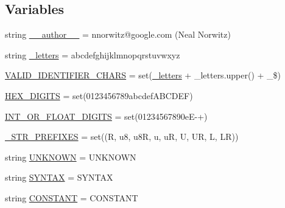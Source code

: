 \subsection*{Variables}
\begin{DoxyCompactItemize}
\item 
string \mbox{\hyperlink{namespacecpp_1_1tokenize_a13ec118ce7f7df6ecd18b3c74d37708a}{\+\_\+\+\_\+author\+\_\+\+\_\+}} = \textquotesingle{}nnorwitz@google.\+com (Neal Norwitz)\textquotesingle{}
\item 
string \mbox{\hyperlink{namespacecpp_1_1tokenize_ab5a9d36b61d51e76473c383db9e4b934}{\+\_\+letters}} = \textquotesingle{}abcdefghijklmnopqrstuvwxyz\textquotesingle{}
\item 
\mbox{\hyperlink{namespacecpp_1_1tokenize_a733f1cf605b1630fb6a0a7f30aaefbec}{V\+A\+L\+I\+D\+\_\+\+I\+D\+E\+N\+T\+I\+F\+I\+E\+R\+\_\+\+C\+H\+A\+RS}} = set(\mbox{\hyperlink{namespacecpp_1_1tokenize_ab5a9d36b61d51e76473c383db9e4b934}{\+\_\+letters}} + \+\_\+letters.\+upper() + \textquotesingle{}\+\_\$\textquotesingle{})
\item 
\mbox{\hyperlink{namespacecpp_1_1tokenize_a8b45b0f0f2b504757e9ede9c342b2c36}{H\+E\+X\+\_\+\+D\+I\+G\+I\+TS}} = set(\textquotesingle{}0123456789abcdef\+A\+B\+C\+D\+E\+F\textquotesingle{})
\item 
\mbox{\hyperlink{namespacecpp_1_1tokenize_ad8c6dd06d4e6ef2e24e9186acb0aff43}{I\+N\+T\+\_\+\+O\+R\+\_\+\+F\+L\+O\+A\+T\+\_\+\+D\+I\+G\+I\+TS}} = set(\textquotesingle{}01234567890e\+E-\/+\textquotesingle{})
\item 
\mbox{\hyperlink{namespacecpp_1_1tokenize_aef952930004258aec982a51c8875e82a}{\+\_\+\+S\+T\+R\+\_\+\+P\+R\+E\+F\+I\+X\+ES}} = set((\textquotesingle{}R\textquotesingle{}, \textquotesingle{}u8\textquotesingle{}, \textquotesingle{}u8R\textquotesingle{}, \textquotesingle{}u\textquotesingle{}, \textquotesingle{}uR\textquotesingle{}, \textquotesingle{}U\textquotesingle{}, \textquotesingle{}UR\textquotesingle{}, \textquotesingle{}L\textquotesingle{}, \textquotesingle{}LR\textquotesingle{}))
\item 
string \mbox{\hyperlink{namespacecpp_1_1tokenize_a0dfd65c08216eed29f74a64b603ac540}{U\+N\+K\+N\+O\+WN}} = \textquotesingle{}U\+N\+K\+N\+O\+WN\textquotesingle{}
\item 
string \mbox{\hyperlink{namespacecpp_1_1tokenize_a1655e62b60899059935930c81ba25c01}{S\+Y\+N\+T\+AX}} = \textquotesingle{}S\+Y\+N\+T\+AX\textquotesingle{}
\item 
string \mbox{\hyperlink{namespacecpp_1_1tokenize_a5e3bf1014a301906871113a989188a78}{C\+O\+N\+S\+T\+A\+NT}} = \textquotesingle{}C\+O\+N\+S\+T\+A\+NT\textquotesingle{}

\end{DoxyCompactItemize}
